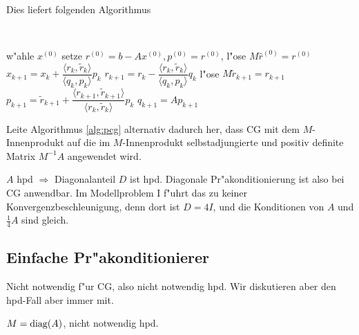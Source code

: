 \renewcommand{\theequation}{\thesection.\arabic{equation}}

Dies liefert folgenden Algorithmus
\begin{alg}\label{alg:pcg}
~\vspace*{-2\baselineskip}
\begin{algorithm}
\begin{algorithmic}
\STATE w"ahle $x^{(0)}$ setze $r^{(0)}=b-Ax^{(0)}, p^{(0)}=r^{(0)}$, l"ose $M\hat r^{(0)}=r^{(0)}$
\STATE $x_{k+1}=x_k +\dfrac{\langle r_k,\widetilde{r}_k\rangle }{\langle q_k,p_k\rangle } p_k$
\STATE $r_{k+1}=r_{k}-\dfrac{\langle r_k,\widetilde{r}_k\rangle }{\langle q_k,p_k\rangle }  q_k$
\STATE l"ose $M\widetilde{r}_{k+1}={r}_{k+1}$
\STATE $p_{k+1} =  \widetilde{r}_{k+1}+\dfrac{\langle r_{k+1},\widetilde{r}_{k+1}\rangle }{\langle r_k,\widetilde{r}_k\rangle } {p}_k $
\STATE $q_{k+1}=A p_{k+1}$
\ENDFOR
\end{algorithmic}
\end{algorithm}
\end{alg}

\begin{aufg} Leite Algorithmus \ref{alg:pcg} alternativ dadurch her, dass CG mit dem $M$-Innenprodukt auf die im $M$-Innenprodukt selbstadjungierte und positiv definite Matrix $M^{-1}A$ angewendet wird.
\end{aufg}

$A$ hpd $\Rightarrow$ Diagonalanteil $D$ ist hpd. Diagonale Pr"akonditionierung ist also bei CG anwendbar. Im Modellproblem I f"uhrt das zu keiner Konvergenzbeschleunigung, denn dort ist $D = 4I$, und die Konditionen von $A$ und $\tfrac{1}{4}A$ sind gleich.


\subsection{Einfache Pr"akonditionierer}

Nicht notwendig f"ur CG, also nicht notwendig hpd. Wir diskutieren aber den hpd-Fall aber immer mit.



\begin{bsp} $M = \operatorname{diag}(A)$, nicht notwendig hpd.

\end{bsp}



